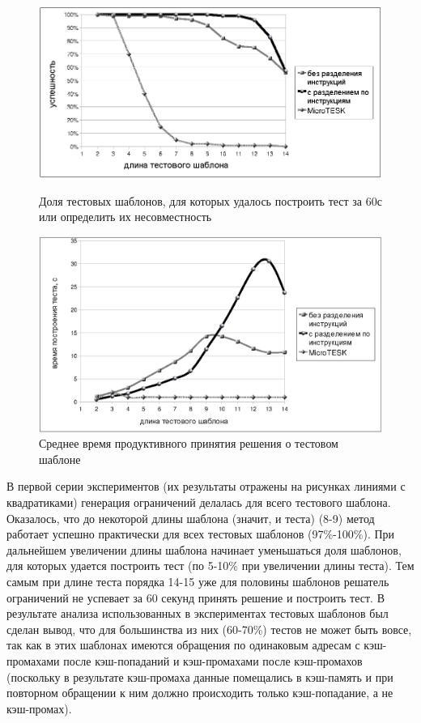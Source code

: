 \documentclass[14pt]{extreport}
\begin{document}
\begin{figure}[p] \center
\parbox[t]{\textwidth}{
  \includegraphics[width=\textwidth]{4.analysis/success_exprmnt}%
\caption{Доля тестовых шаблонов, для которых удалось построить тест за 60с или
определить их несовместность}\label{fig:success_experiment}
}

\vspace{1.5cm}

\parbox[t]{\textwidth}{
  \includegraphics[width=\textwidth]{4.analysis/time_exprmnt}
  \caption{Среднее время продуктивного принятия решения о тестовом
шаблоне}\label{fig:time_experiment}
}
\end{figure}

В первой серии экспериментов (их результаты отражены на рисунках линиями с
квадратиками) генерация ограничений делалась для всего тестового шаблона.
Оказалось, что до некоторой длины шаблона (значит, и теста) (8-9) метод работает
успешно практически для всех тестовых шаблонов (97\%-100\%). При дальнейшем
увеличении длины шаблона начинает уменьшаться доля шаблонов, для которых удается
построить тест (по 5-10\% при увеличении длины теста). Тем самым при длине теста
порядка 14-15 уже для половины шаблонов решатель ограничений не успевает за 60
секунд принять решение и построить тест. В результате анализа использованных в
экспериментах тестовых шаблонов был сделан вывод, что для большинства из них
(60-70\%) тестов не может быть вовсе, так как в этих шаблонах имеются обращения
по одинаковым адресам с кэш-промахами после кэш-попаданий и кэш-промахами после
кэш-промахов (поскольку в результате кэш-промаха данные помещались в кэш-память
и при повторном обращении к ним должно происходить только кэш-попадание, а не
кэш-промах).
\end{document}
